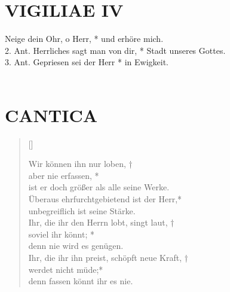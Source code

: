 \begin{flushleft}


\end{flushleft}

\section{VIGILIAE IV}

\begin{sloppypar}
{ Neige dein Ohr, o Herr, * und erhöre mich. \\
2. Ant. Herrliches sagt man von dir, * Stadt unseres Gottes. \\
3. Ant. Gepriesen sei der Herr * in Ewigkeit.\\ \\}
\end{sloppypar}

\begin{flushleft}


\end{flushleft}

\section[CANTICA]{CANTICA}


\vspace{0.2cm}

\def\greinitialformat#1{{\fontsize{40}{40}\selectfont #1}}
\gresetfirstlineaboveinitial{\small \textcolor{red}{Cant.}}{}
\setaboveinitialseparation{0.72mm}



\begin{verse}[\versewidth]
 
\vin Wir können ihn nur loben, †\\
\vin aber nie erfassen, *\\
\vin ist er doch größer als alle seine Werke.\\
Überaus ehrfurchtgebietend ist der Herr,*\\
unbegreiflich ist seine Stärke.\\
\vin Ihr, die ihr den Herrn lobt, singt laut, †\\
\vin soviel ihr könnt; *\\
\vin denn nie wird es genügen.\\
Ihr, die ihr ihn preist, schöpft neue Kraft, †\\
werdet nicht müde;*\\
denn fassen könnt ihr es nie. \\

\end{verse}


